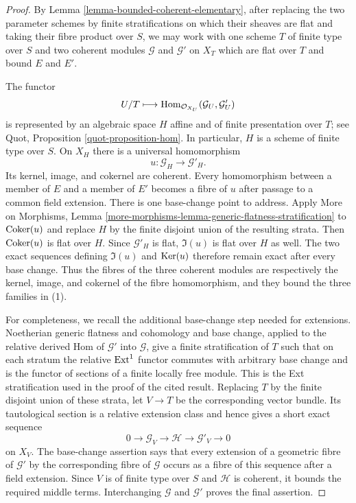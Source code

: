 \begin{proof}
By Lemma \ref{lemma-bounded-coherent-elementary}, after replacing the two
parameter schemes by finite stratifications on which their sheaves are flat
and taking their fibre product over $S$, we may work with one scheme $T$ of
finite type over $S$ and two coherent modules $\mathcal{G}$ and
$\mathcal{G}'$ on $X_T$ which are flat over $T$ and bound $E$ and $E'$.

The functor
$$
U/T \longmapsto
\mathop{\mathrm{Hom}}\nolimits_{\mathcal{O}_{X_U}}(\mathcal{G}_U, \mathcal{G}'_U)
$$
is represented by an algebraic space $H$ affine and of finite presentation
over $T$; see Quot, Proposition \ref{quot-proposition-hom}. In particular,
$H$ is a scheme of finite type over $S$. On $X_H$ there is a universal
homomorphism
$$
u : \mathcal{G}_H \longrightarrow \mathcal{G}'_H.
$$
Its kernel, image, and cokernel are coherent. Every homomorphism between a
member of $E$ and a member of $E'$ becomes a fibre of $u$ after passage to
a common field extension. There is one base-change point to address. Apply
More on Morphisms, Lemma
\ref{more-morphisms-lemma-generic-flatness-stratification} to
$\mathop{\mathrm{Coker}}(u)$ and replace $H$ by the finite disjoint union of the resulting
strata. Then $\mathop{\mathrm{Coker}}(u)$ is flat over $H$. Since $\mathcal{G}'_H$ is flat,
$\Im(u)$ is flat over $H$ as well. The two exact sequences defining
$\Im(u)$ and $\mathop{\mathrm{Ker}}(u)$ therefore remain exact after every base change.
Thus the fibres of the three coherent modules are respectively the kernel,
image, and cokernel of the fibre homomorphism, and they bound the three
families in (1).

For completeness, we recall the additional base-change step needed for
extensions. Noetherian generic flatness and cohomology and base change,
applied to the relative derived Hom of $\mathcal{G}'$ into $\mathcal{G}$,
give a finite stratification of $T$ such that on each stratum the relative
$\mathop{\mathrm{Ext}}\nolimits^1$ functor commutes with arbitrary base change and is the functor of
sections of a finite locally free module. This is the Ext stratification
used in the proof of the cited result. Replacing $T$ by the finite disjoint
union of these strata, let $V \to T$ be the corresponding vector bundle.
Its tautological section is a relative extension class and hence gives a
short exact sequence
$$
0 \longrightarrow \mathcal{G}_V \longrightarrow \mathcal{H}
\longrightarrow \mathcal{G}'_V \longrightarrow 0
$$
on $X_V$. The base-change assertion says that every extension of a geometric
fibre of $\mathcal{G}'$ by the corresponding fibre of $\mathcal{G}$ occurs
as a fibre of this sequence after a field extension. Since $V$ is of finite
type over $S$ and $\mathcal{H}$ is coherent, it bounds the required middle
terms. Interchanging $\mathcal{G}$ and $\mathcal{G}'$ proves the final
assertion.
\end{proof}





